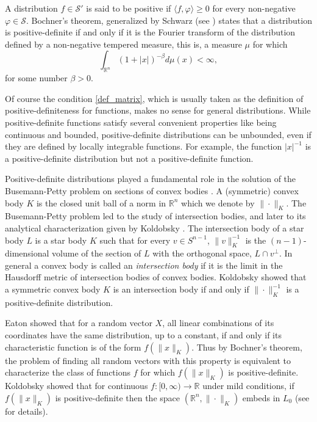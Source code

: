 \documentclass{amsart}
\def \R {\mathbb R}
\def \S {\mathcal S}
\begin{document}
A distribution $f \in \S'$ is said to be positive if $\langle f, \varphi \rangle \geq 0$ for every non-negative $\varphi \in \S$.
Bochner's theorem, generalized by Schwarz (see \cite[Theorem 2, Section 2.2]{gelfandvilenkin}) states that a distribution is positive-definite if and only if
it is the Fourier transform of the distribution defined by a non-negative tempered measure, this is, a measure $\mu$ for which 
\[\int_{\R^n} (1+|x|)^{-\beta} d\mu(x) < \infty,\]
for some number $\beta > 0$.

Of course the condition \eqref{def_matrix}, which is usually taken as the definition of positive-definiteness for functions, makes no sense for general distributions.
While positive-definite functions satisfy several convenient properties like being continuous and bounded, positive-definite distributions can be unbounded, even if they are defined by locally integrable functions.
For example, the function $|x|^{-1}$ is a positive-definite distribution but not a positive-definite function.

Positive-definite distributions played a fundamental role in the solution of the Busemann-Petty problem on sections of convex bodies \cite[Chapter 5]{koldobsky2005fourier}.
A (symmetric) convex body $K$ is the closed unit ball of a norm in $\R^n$ which we denote by $\|\cdot\|_K$.
The Busemann-Petty problem led to the study of intersection bodies, and later to its analytical characterization given by Koldobsky \cite{koldobsky2005fourier}.
The intersection body of a star body $L$ is a star body $K$ such that for every $v \in S^{n-1}$, $\|v\|_K^{-1}$ is the $(n-1)$-dimensional volume of the section of $L$ with the orthogonal space, $L \cap v^\perp$.
In general a convex body is called an {\it intersection body} if it is the limit in the Hausdorff metric of intersection bodies of convex bodies.
Koldobsky showed \cite{koldobsky2005fourier} that a symmetric convex body $K$ is an intersection body if and only if $\|\cdot\|_K^{-1}$ is a positive-definite distribution.

Eaton \cite{eaton1981projections} showed that for a random vector $X$, all linear combinations of its coordinates have the same distribution, up to a constant, if and only if its characteristic function is of the form $f(\|x\|_K)$.
Thus by Bochner's theorem, the problem of finding all random vectors with this property is equivalent to characterize the class of functions $f$ for which $f(\|x\|_K)$ is positive-definite. Koldobsky showed \cite{koldobsky2011positive} that for continuous $f:[0, \infty) \to \R$ under mild conditions, if $f(\|x\|_K)$ is positive-definite then the space $(\R^n, \|\cdot\|_K)$ embeds in $L_0$ (see \cite{koldobsky2011positive, kalton2007geometry} for details).
\end{document}
